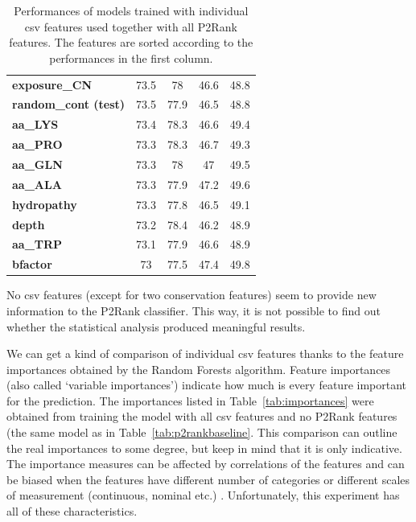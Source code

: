 \begin{table}[]
{\begin{tabular}{lcccc}
\textbf{exposure\_CN}         & 73.5           & 78                 & 46.6           & 48.8               \\
\textbf{random\_cont (test)}         & 73.5           & 77.9               & 46.5           & 48.8               \\
\textbf{aa\_LYS}              & 73.4           & 78.3               & 46.6           & 49.4               \\
\textbf{aa\_PRO}              & 73.3           & 78.3               & 46.7           & 49.3               \\
\textbf{aa\_GLN}              & 73.3           & 78                 & 47             & 49.5               \\
\textbf{aa\_ALA}              & 73.3           & 77.9               & 47.2           & 49.6               \\
\textbf{hydropathy}           & 73.3           & 77.8               & 46.5           & 49.1               \\
\textbf{depth}                & 73.2           & 78.4               & 46.2           & 48.9               \\
\textbf{aa\_TRP}              & 73.1           & 77.9               & 46.6           & 48.9               \\
\textbf{bfactor}              & 73             & 77.5               & 47.4           & 49.8               \\ \hline
\end{tabular}
}
\caption[Performances of models trained with individual csv features]{Performances of models trained with individual csv features used together with all P2Rank features. The features are sorted according to the performances in the first column.}
\label{tab:p2rankCSV}
\end{table}

No csv features (except for two conservation features) seem to provide new information to the P2Rank classifier. This way, it is not possible to find out whether the statistical analysis produced meaningful results.

We can get a kind of comparison of individual csv features thanks to the feature importances obtained by the Random Forests algorithm. Feature importances (also called `variable importances') indicate how much is every feature important for the prediction. The importances listed in Table~\ref{tab:importances} were obtained from training the model with all csv features and no P2Rank features (the same model as in Table~\ref{tab:p2rankbaseline}. This comparison can outline the real importances to some degree, but keep in mind that it is only indicative. The importance measures can be affected by correlations of the features \cite{variableimportance} and can be biased when the features have different number of categories or different scales of measurement (continuous, nominal etc.)  \cite{bias_importance}. Unfortunately, this experiment has all of these characteristics.

